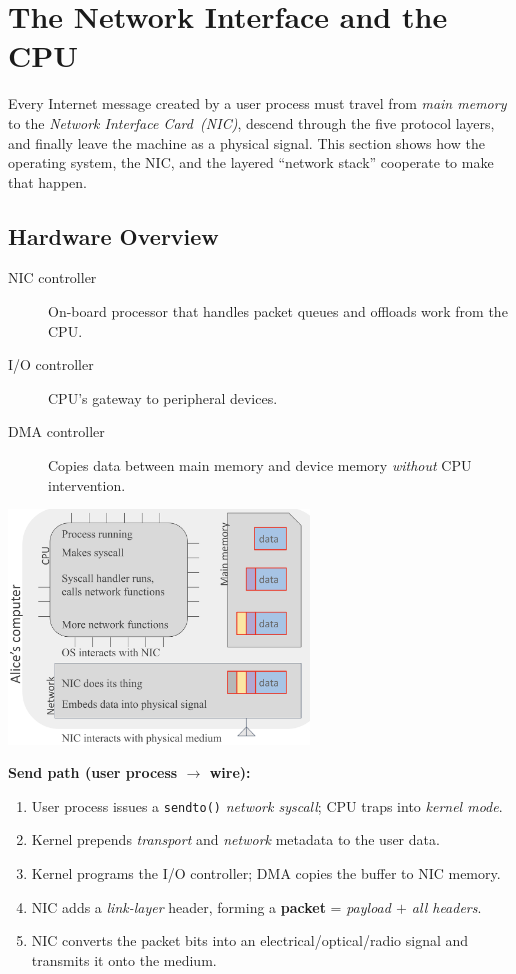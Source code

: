 \documentclass[../../compsys.tex]{subfiles}
\begin{document}
\section{The Network Interface and the CPU}\label{sec:nic-cpu}
Every Internet message created by a user process must travel from
\emph{main memory} to the \emph{Network Interface Card~(NIC)}, descend
through the five protocol layers, and finally leave the machine as a
physical signal.  This section shows how the operating system, the NIC,
and the layered “network stack” cooperate to make that happen.

\subsection{Hardware Overview}\label{subsec:nic-hw}

\begin{description}
  \item[NIC controller] On-board processor that handles packet queues and
        offloads work from the CPU.
  \item[I/O controller] CPU’s gateway to peripheral devices.
  \item[DMA controller] Copies data between main memory and device
        memory \emph{without} CPU intervention.
\end{description}
\begin{center}
  \includegraphics[width=0.60\textwidth]{images/nic.png}
\end{center}

\noindent
\textbf{Send path (user process $\rightarrow$ wire):}
\begin{enumerate}
  \item User process issues a \texttt{sendto()} \emph{network
        syscall}; CPU traps into \emph{kernel mode}.
  \item Kernel prepends \emph{transport} and \emph{network} metadata to
        the user data.
  \item Kernel programs the I/O controller; DMA copies the buffer to NIC
        memory.
  \item NIC adds a \emph{link-layer} header, forming a
        \textbf{packet} = \emph{payload $+$ all headers}.
  \item NIC converts the packet bits into an electrical/optical/radio
        signal and transmits it onto the medium.
\end{enumerate}
\newpage
\end{document}
